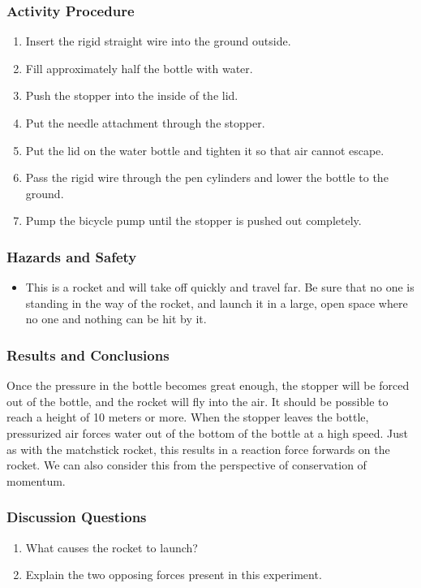 \subsubsection*{Activity Procedure}
\begin{enumerate}
\item{Insert the rigid straight wire into the ground outside.}
\item{Fill approximately half the bottle with water.}
\item{Push the stopper into the inside of the lid.}
\item{Put the needle attachment through the stopper.}
\item{Put the lid on the water bottle and tighten it so that air cannot escape.}
\item{Pass the rigid wire through the pen cylinders and lower the bottle to the ground.}\item{Pump the bicycle pump until the stopper is pushed out completely.}
\end{enumerate}

\subsubsection*{Hazards and Safety}
\begin{itemize}
\item{This is a rocket and will take off quickly and travel far.  Be sure that no one is standing in the way of the rocket, and launch it in a large, open space where no one and nothing can be hit by it.}
\end{itemize}

\subsubsection*{Results and Conclusions}
Once the pressure in the bottle becomes great enough, the stopper will be forced out of the bottle, and the rocket will fly into the air. It should be possible to reach a height of 10 meters or more.  When the stopper leaves the bottle, pressurized air forces water out of the bottom of the bottle at a high speed. Just as with the matchstick rocket, this results in a reaction force forwards on the rocket.
We can also consider this from the perspective of conservation of momentum.


\subsubsection*{Discussion Questions}
\begin{enumerate}
\item{What causes the rocket to launch?}
\item{Explain the two opposing forces present in this experiment.}
\end{enumerate}

